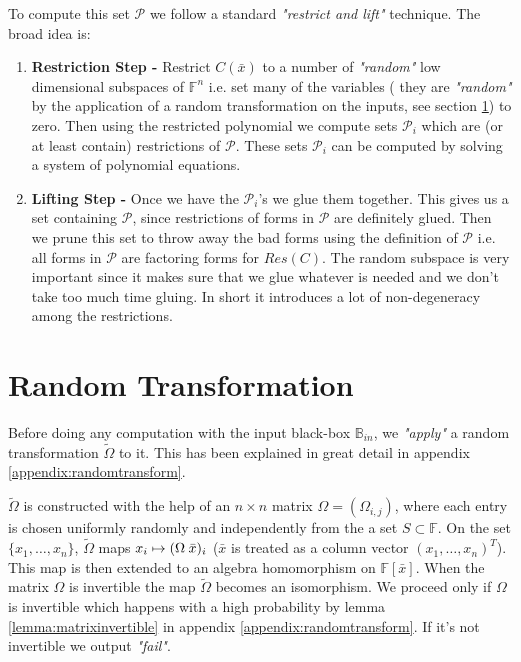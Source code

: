 \documentclass[12pt]{caltech_thesis}
\theoremstyle{plain}
\theoremstyle{definition}
\newcommand{\F}{\mathbb{F}}
\newcommand{\MP}{\mathcal{P}}
\newcommand{\CB}{\mathbb{B}}
\newcommand{\B}[1]{\bar{#1}}
\begin{document}
To compute this set $\MP$ we follow a standard \emph{"restrict and lift"} technique. The broad idea is:
\begin{enumerate}
 \item \textbf{Restriction Step - } Restrict $C(\B{x})$ to a number of \emph{"random"} low dimensional subspaces of $\F^n$ i.e. set
 many of the variables ( they are \emph{"random"} by the application of a random transformation on the inputs, see section \ref{section:stepzero}) to zero.
 Then using the restricted polynomial we compute sets $\MP_i$ which are (or at least contain) restrictions of $\MP$. These sets $\MP_i$
 can be computed by solving a system of polynomial equations.
 \item \textbf{ Lifting Step - }Once we have the $\MP_i$'s we glue them together. 
 This gives us a set containing $\MP$, since restrictions of forms in $\MP$ are definitely glued. Then we prune this set to throw 
 away the bad forms using the definition of $\MP$ i.e. all forms in $\MP$ are factoring forms for $Res(C)$. The random subspace is very
 important since it makes sure that we glue whatever is needed and we don't take too much time gluing. In short it introduces
 a lot of non-degeneracy among the restrictions.
\end{enumerate}

\section{Random Transformation}\label{section:stepzero}
Before doing any computation with the input black-box $\CB_{in}$, we \emph{"apply"} a random transformation $\tilde\Omega$ to it. 
This has been explained in great detail in appendix \ref{appendix:randomtransform}.

$\tilde \Omega$ is constructed with the help of an $n\times n$ matrix
$\Omega = (\Omega_{i,j})$, where each entry is chosen uniformly randomly and independently from the a set $S\subset \F$. On the set
$\{x_1,\ldots,x_n\}$, $\tilde\Omega$ maps $x_i\mapsto (\Omega\hspace{0.25em} \B{x})_i$ ($\B{x}$ is treated as a column vector $(x_1,\ldots,x_n)^T$).
This map is then extended to an algebra homomorphism on $\F[\B{x}]$. When the matrix $\Omega$ is invertible the map $\tilde \Omega$ becomes an isomorphism. 
We proceed only if $\Omega$ is invertible which happens with a high probability 
by lemma \ref{lemma:matrixinvertible} in appendix \ref{appendix:randomtransform}. If it's not invertible we output \emph{"fail"}.
\end{document}
